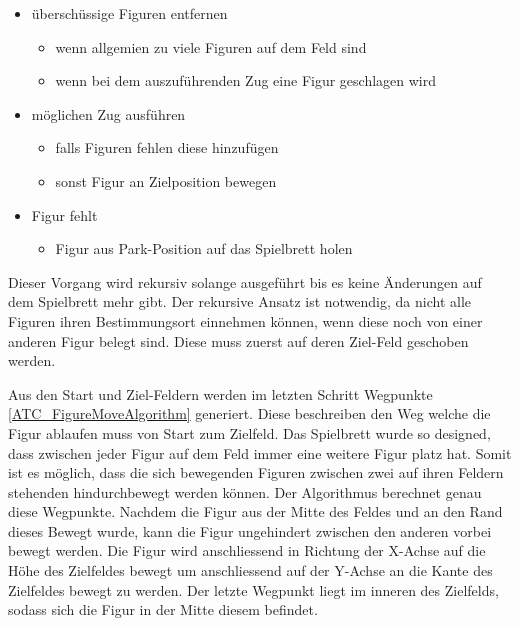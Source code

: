 \begin{itemize}
\tightlist
\item
  überschüssige Figuren entfernen

  \begin{itemize}
  \tightlist
  \item
    wenn allgemien zu viele Figuren auf dem Feld sind
  \item
    wenn bei dem auszuführenden Zug eine Figur geschlagen wird
  \end{itemize}
\item
  möglichen Zug ausführen

  \begin{itemize}
  \tightlist
  \item
    falls Figuren fehlen diese hinzufügen
  \item
    sonst Figur an Zielposition bewegen
  \end{itemize}
\item
  Figur fehlt

  \begin{itemize}
  \tightlist
  \item
    Figur aus Park-Position auf das Spielbrett holen
  \end{itemize}
\end{itemize}

Dieser Vorgang wird rekursiv solange ausgeführt bis es keine Änderungen
auf dem Spielbrett mehr gibt. Der rekursive Ansatz ist notwendig, da
nicht alle Figuren ihren Bestimmungsort einnehmen können, wenn diese
noch von einer anderen Figur belegt sind. Diese muss zuerst auf deren
Ziel-Feld geschoben werden.

Aus den Start und Ziel-Feldern werden im letzten Schritt Wegpunkte
\ref{ATC_FigureMoveAlgorithm} generiert. Diese beschreiben den Weg
welche die Figur ablaufen muss von Start zum Zielfeld. Das Spielbrett
wurde so designed, dass zwischen jeder Figur auf dem Feld immer eine
weitere Figur platz hat. Somit ist es möglich, dass die sich bewegenden
Figuren zwischen zwei auf ihren Feldern stehenden hindurchbewegt werden
können. Der Algorithmus berechnet genau diese Wegpunkte. Nachdem die
Figur aus der Mitte des Feldes und an den Rand dieses Bewegt wurde, kann
die Figur ungehindert zwischen den anderen vorbei bewegt werden. Die
Figur wird anschliessend in Richtung der X-Achse auf die Höhe des
Zielfeldes bewegt um anschliessend auf der Y-Achse an die Kante des
Zielfeldes bewegt zu werden. Der letzte Wegpunkt liegt im inneren des
Zielfelds, sodass sich die Figur in der Mitte diesem befindet.

